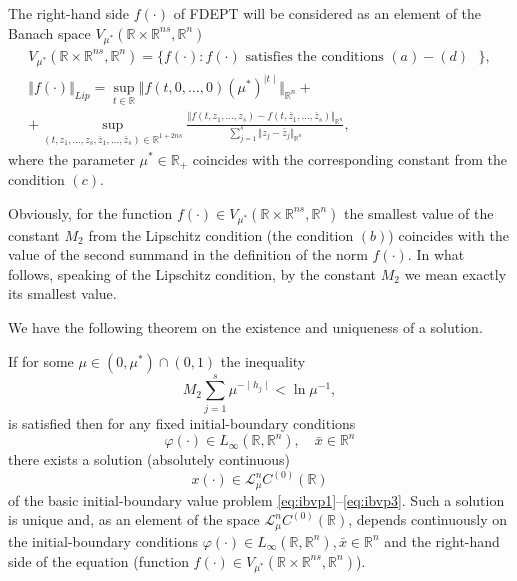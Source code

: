\documentclass[
11pt,%
tightenlines,%
twoside,%
onecolumn,%
nofloats,%
nobibnotes,%
nofootinbib,%
superscriptaddress,%
noshowpacs,%
centertags,aps]%
{revtex4}
\begin{document}
The right-hand side $f(\cdot)$ of FDEPT will be considered as an element of the Banach space $V_{\mu^*}(\mathbb R\times\mathbb R^{ns},\mathbb R^n)$
\begin{eqnarray*}
V_{\mu^*}(\mathbb R\times\mathbb R^{ns},\mathbb R^n)=\bigl\{f(\cdot): f(\cdot) \text{ satisfies the conditions $(a)-(d)$ }\bigr\},\\
\Vert f(\cdot)\Vert_{Lip}=\sup_{t\in \mathbb R} \Vert f(t,0,\ldots,0)(\mu^*)^{\mid t\mid}\Vert_{\mathbb R^n}+\\
+\sup_{(t,z_1,\ldots,z_s,\bar z_1,\ldots,\bar z_s)\in \mathbb R^{1+2ns}} \frac{\Vert f(t,z_1,\ldots,z_s)-f(t,\bar z_1,\ldots,\bar z_s)\Vert_{\mathbb R^n}}{\sum_{j=1}^s \Vert z_j-\bar z_j\Vert_{\mathbb R^n}},
\end{eqnarray*}
where the parameter $\mu^*\in \mathbb R_+$ coincides with the corresponding constant from the condition $(c)$.

Obviously, for the function $f(\cdot)\in V_{\mu^*}(\mathbb R\times \mathbb R^{ns},\mathbb R^n)$ the smallest value of the constant $M_2$  from the Lipschitz condition (the condition $(b)$) coincides with the value of the second summand in the definition of the norm $f(\cdot)$. In what follows, speaking of the Lipschitz condition, by the constant $M_2$ we mean exactly its smallest value.

We have the following theorem on the existence and uniqueness of a solution.
\begin{theorem}\label{thm1}
If for some $\mu\in(0,\mu^*)\cap(0,1)$ the inequality
\begin{equation*}
M_2\sum_{j=1}^s \mu^{-\mid h_j\mid}<\ln \mu^{-1},
\end{equation*}
is satisfied then for any fixed initial-boundary conditions
\[
\varphi(\cdot)\in L_\infty(\mathbb R, \mathbb R^n),\quad \bar x\in{\mathbb R^n}
\]
there exists a solution (absolutely continuous)
\[
x(\cdot)\in \mathcal L^n_\mu C^{(0)}(\mathbb R)
\]
of the basic initial-boundary value problem \eqref{eq:ibvp1}--\eqref{eq:ibvp3}. Such a solution is unique and, as an element of the space $\mathcal L^n_\mu C^{(0)}(\mathbb R)$, depends continuously on the initial-boundary conditions $\varphi(\cdot)\in L_\infty(\mathbb R,\mathbb R^n), \bar x\in{\mathbb R^n}$ and the right-hand side of the equation (function $f(\cdot)\in V_{\mu^*}(\mathbb R\times\mathbb R^{ns},\mathbb R^n)$).
\end{theorem}
\end{document}
